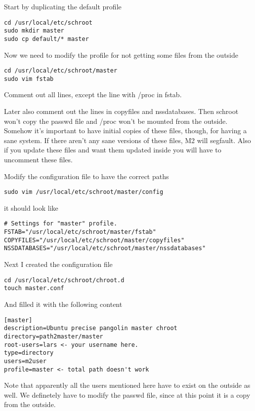 \documentclass[a4paper]{book}
\begin{document}
Start by duplicating the default profile

\begin{verbatim}
cd /usr/local/etc/schroot
sudo mkdir master
sudo cp default/* master
\end{verbatim}

Now we need to modify the profile for not getting some files from the outside

\begin{verbatim}
cd /usr/local/etc/schroot/master
sudo vim fstab
\end{verbatim}

Comment out all lines, except the line with /proc in fstab. 

Later also comment out the lines in copyfiles and nssdatabases.  Then schroot
won't copy the passwd file and /proc won't be mounted from the outside.
Somehow it's important to have initial copies of these files, though, for
having a sane system. If there aren't any sane versions of these files, M2 will
segfault.  Also if you update these files and want them updated inside you will
have to uncomment these files.

Modify the configuration file to have the correct paths

\begin{verbatim}
sudo vim /usr/local/etc/schroot/master/config
\end{verbatim}

it should look like

\begin{verbatim}
# Settings for "master" profile.
FSTAB="/usr/local/etc/schroot/master/fstab"
COPYFILES="/usr/local/etc/schroot/master/copyfiles"
NSSDATABASES="/usr/local/etc/schroot/master/nssdatabases"
\end{verbatim}

Next I created the configuration file

\begin{verbatim}
cd /usr/local/etc/schroot/chroot.d
touch master.conf
\end{verbatim}

And filled it with the following content

\begin{verbatim}
[master]
description=Ubuntu precise pangolin master chroot
directory=path2master/master
root-users=lars <- your username here.
type=directory
users=m2user
profile=master <- total path doesn't work
\end{verbatim}

Note that apparently all the users mentioned here have to exist on the outside
as well.  We definetely have to modify the passwd file, since at this point it
is a copy from the outside.
\end{document}
